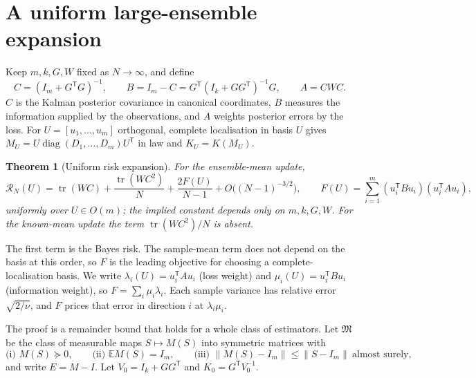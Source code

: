 \documentclass[11pt,a4paper]{article}
\numberwithin{equation}{section}
\newtheorem{theorem}{Theorem}[section]
\theoremstyle{remark}\newtheorem{remark}[theorem]{Remark}
\newcommand{\E}{\mathbb E}
\newcommand{\tr}{\operatorname{tr}}
\newcommand{\diag}{\operatorname{diag}}
\newcommand{\risk}{\mathcal R}
\newcommand{\T}{^{\mathsf T}}
\newcommand{\norm}[1]{\left\lVert#1\right\rVert}
\begin{document}
\section{A uniform large-ensemble expansion}\label{sec:expansion}

Keep \(m,k,G,W\) fixed as \(N\to\infty\), and define
\[
 C=(I_m+G\T G)^{-1},\qquad B=I_m-C=G\T(I_k+GG\T)^{-1}G,\qquad A=CWC .
\]
\(C\) is the Kalman posterior covariance in canonical coordinates, \(B\) measures the
information supplied by the observations, and \(A\) weights posterior errors by the loss. For
\(U=[u_1,\ldots,u_m]\) orthogonal, complete localisation in basis \(U\) gives
\(M_U=U\diag(D_1,\ldots,D_m)U\T\) in law and \(K_U=K(M_U)\).

\begin{theorem}[Uniform risk expansion]\label{thm:expansion}
For the ensemble-mean update,
\begin{equation}\label{eq:expansion}
 \risk_N(U)=\tr(WC)+\frac{\tr(WC^2)}N+\frac{2F(U)}{N-1}+O\bigl((N-1)^{-3/2}\bigr),
 \qquad
 F(U)=\sum_{i=1}^m(u_i\T Bu_i)(u_i\T Au_i),
\end{equation}
uniformly over \(U\in O(m)\); the implied constant depends only on \(m,k,G,W\). For the
known-mean update the term \(\tr(WC^2)/N\) is absent.
\end{theorem}

The first term is the Bayes risk. The sample-mean term does not depend on the basis at this
order, so \(F\) is the leading objective for choosing a complete-localisation basis. We write
\(\lambda_i(U)=u_i\T Au_i\) (loss weight) and \(\mu_i(U)=u_i\T Bu_i\) (information weight), so
\(F=\sum_i\mu_i\lambda_i\). Each sample variance has relative error \(\sqrt{2/\nu}\), and
\(F\) prices that error in direction \(i\) at \(\lambda_i\mu_i\).

The proof is a remainder bound that holds for a whole class of estimators. Let
\(\mathfrak M\) be the class of measurable maps \(S\mapsto M(S)\) into symmetric matrices with
\begin{equation}\label{eq:class}
 \text{(i) } M(S)\succeq0,\qquad
 \text{(ii) } \E M(S)=I_m,\qquad
 \text{(iii) } \norm{M(S)-I_m}\le\norm{S-I_m}\ \text{almost surely},
\end{equation}
and write \(E=M-I\). Let \(V_0=I_k+GG\T\) and \(K_0=G\T V_0^{-1}\).
\end{document}
